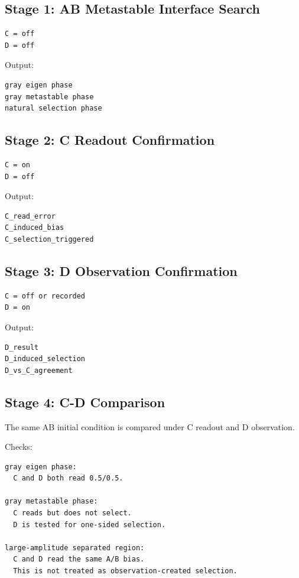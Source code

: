 \documentclass{article}
\begin{document}
\subsection{Stage 1: AB Metastable Interface
Search}\label{stage-1-ab-metastable-interface-search}

\begin{verbatim}
C = off
D = off
\end{verbatim}

Output:

\begin{verbatim}
gray eigen phase
gray metastable phase
natural selection phase
\end{verbatim}

\subsection{Stage 2: C Readout
Confirmation}\label{stage-2-c-readout-confirmation}

\begin{verbatim}
C = on
D = off
\end{verbatim}

Output:

\begin{verbatim}
C_read_error
C_induced_bias
C_selection_triggered
\end{verbatim}

\subsection{Stage 3: D Observation
Confirmation}\label{stage-3-d-observation-confirmation}

\begin{verbatim}
C = off or recorded
D = on
\end{verbatim}

Output:

\begin{verbatim}
D_result
D_induced_selection
D_vs_C_agreement
\end{verbatim}

\subsection{Stage 4: C-D Comparison}\label{stage-4-c-d-comparison}

The same AB initial condition is compared under C readout and D
observation.

Checks:

\begin{verbatim}
gray eigen phase:
  C and D both read 0.5/0.5.

gray metastable phase:
  C reads but does not select.
  D is tested for one-sided selection.

large-amplitude separated region:
  C and D read the same A/B bias.
  This is not treated as observation-created selection.
\end{verbatim}
\end{document}
